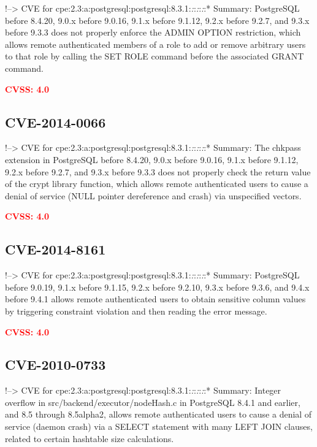 \documentclass[a4paper, 12pt]{article}
\begin{document}
!--\textgreater{} CVE for
cpe:2.3:a:postgresql:postgresql:8.3.1:\emph{:}:\emph{:}:\emph{:}:*
Summary: PostgreSQL before 8.4.20, 9.0.x before 9.0.16, 9.1.x before
9.1.12, 9.2.x before 9.2.7, and 9.3.x before 9.3.3 does not properly
enforce the ADMIN OPTION restriction, which allows remote authenticated
members of a role to add or remove arbitrary users to that role by
calling the SET ROLE command before the associated GRANT command.

\textbf{\textcolor{red}{CVSS: 4.0}}

\hypertarget{cve-2014-0066}{%
\subsection{CVE-2014-0066}\label{cve-2014-0066}}

!--\textgreater{} CVE for
cpe:2.3:a:postgresql:postgresql:8.3.1:\emph{:}:\emph{:}:\emph{:}:*
Summary: The chkpass extension in PostgreSQL before 8.4.20, 9.0.x before
9.0.16, 9.1.x before 9.1.12, 9.2.x before 9.2.7, and 9.3.x before 9.3.3
does not properly check the return value of the crypt library function,
which allows remote authenticated users to cause a denial of service
(NULL pointer dereference and crash) via unspecified vectors.

\textbf{\textcolor{red}{CVSS: 4.0}}

\hypertarget{cve-2014-8161}{%
\subsection{CVE-2014-8161}\label{cve-2014-8161}}

!--\textgreater{} CVE for
cpe:2.3:a:postgresql:postgresql:8.3.1:\emph{:}:\emph{:}:\emph{:}:*
Summary: PostgreSQL before 9.0.19, 9.1.x before 9.1.15, 9.2.x before
9.2.10, 9.3.x before 9.3.6, and 9.4.x before 9.4.1 allows remote
authenticated users to obtain sensitive column values by triggering
constraint violation and then reading the error message.

\textbf{\textcolor{red}{CVSS: 4.0}}

\hypertarget{cve-2010-0733}{%
\subsection{CVE-2010-0733}\label{cve-2010-0733}}

!--\textgreater{} CVE for
cpe:2.3:a:postgresql:postgresql:8.3.1:\emph{:}:\emph{:}:\emph{:}:*
Summary: Integer overflow in src/backend/executor/nodeHash.c in
PostgreSQL 8.4.1 and earlier, and 8.5 through 8.5alpha2, allows remote
authenticated users to cause a denial of service (daemon crash) via a
SELECT statement with many LEFT JOIN clauses, related to certain
hashtable size calculations.
\end{document}
